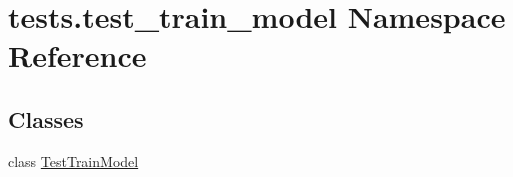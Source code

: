 \hypertarget{namespacetests_1_1test__train__model}{}\section{tests.\+test\+\_\+train\+\_\+model Namespace Reference}
\label{namespacetests_1_1test__train__model}
\subsection*{Classes}
\begin{DoxyCompactItemize}
\item 
class \hyperlink{classtests_1_1test__train__model_1_1TestTrainModel}{Test\+Train\+Model}
\end{DoxyCompactItemize}

